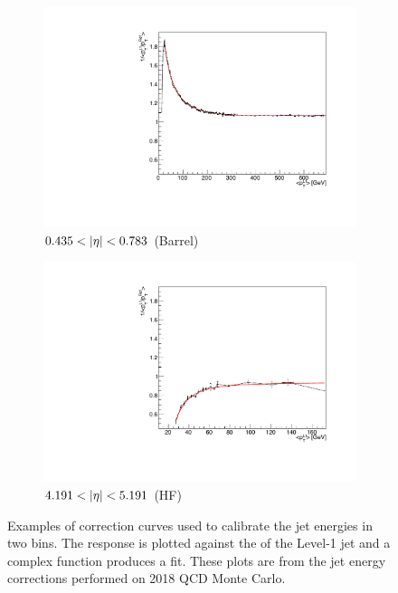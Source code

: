 \begin{figure}[htbp]
    \centering
    \begin{subfigure}[b]{0.45\textwidth}
        \includegraphics[width=\textwidth]{./figures/jecs//corrCurveBarrel.pdf}
        \caption{$0.435 < \lvert \eta \rvert < 0.783$ (Barrel)}
        \label{fig:detector_jecs_corr_curve_Barrel}
    \end{subfigure}
    \hfill
    \begin{subfigure}[b]{0.45\textwidth}
        \includegraphics[width=\textwidth]{./figures/jecs/corrCurveHF.pdf}
        \caption{$4.191 < \lvert \eta \rvert < 5.191$ (HF)}
        \label{fig:detector_jecs_corr_curve_HF}
    \end{subfigure}
\caption[Examples of correction curves used to calibrate the jet energies in two \texorpdfstring{\abseta}{abs-eta} bins]{Examples of correction curves used to calibrate the jet energies in two \abseta bins. The response is plotted against the \pt of the Level-1 jet and a complex function produces a fit. These plots are from the jet energy corrections performed on 2018 QCD Monte Carlo.}
\label{fig:detector_jecs_corr_curves}
\end{figure}


